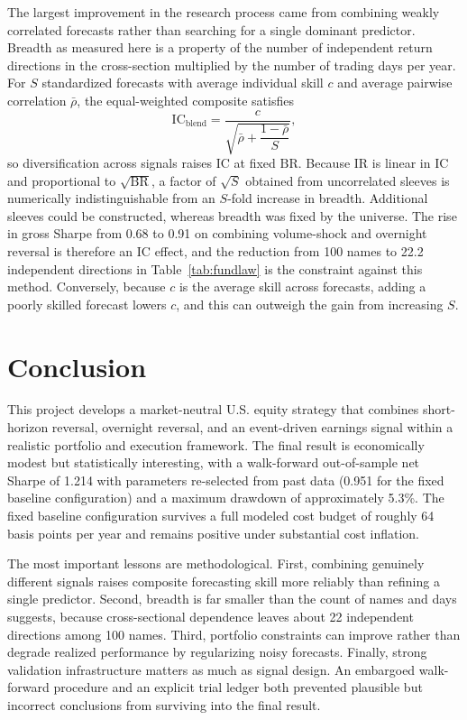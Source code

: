 \documentclass[11pt]{article}
\newcommand{\IR}{\mathrm{IR}}
\newcommand{\IC}{\mathrm{IC}}
\newcommand{\BR}{\mathrm{BR}}
\begin{document}
The largest improvement in the research process came from combining weakly correlated forecasts rather than searching for a single dominant predictor. Breadth as measured here is a property of the number of independent return directions in the cross-section multiplied by the number of trading days per year. For $S$ standardized forecasts with average individual skill $c$ and average pairwise correlation $\bar{\rho}$, the equal-weighted composite satisfies
\begin{equation}
\IC_{\text{blend}} = \frac{c}{\sqrt{\bar{\rho} + \dfrac{1-\bar{\rho}}{S}}},
\label{eq:blendic}
\end{equation}
so diversification across signals raises $\IC$ at fixed $\BR$. Because $\IR$ is linear in $\IC$ and proportional to $\sqrt{\BR}$, a factor of $\sqrt{S}$ obtained from uncorrelated sleeves is numerically indistinguishable from an $S$-fold increase in breadth. Additional sleeves could be constructed, whereas breadth was fixed by the universe. The rise in gross Sharpe from 0.68 to 0.91 on combining volume-shock and overnight reversal is therefore an $\IC$ effect, and the reduction from 100 names to 22.2 independent directions in Table~\ref{tab:fundlaw} is the constraint against this method. Conversely, because $c$ is the average skill across forecasts, adding a poorly skilled forecast lowers $c$, and this can outweigh the gain from increasing $S$.


\section{Conclusion}

This project develops a market-neutral U.S. equity strategy that combines short-horizon reversal, overnight reversal, and an event-driven earnings signal within a realistic portfolio and execution framework. The final result is economically modest but statistically interesting, with a walk-forward out-of-sample net Sharpe of 1.214 with parameters re-selected from past data (0.951 for the fixed baseline configuration) and a maximum drawdown of approximately 5.3\%. The fixed baseline configuration survives a full modeled cost budget of roughly 64 basis points per year and remains positive under substantial cost inflation.

The most important lessons are methodological. First, combining genuinely different signals raises composite forecasting skill more reliably than refining a single predictor. Second, breadth is far smaller than the count of names and days suggests, because cross-sectional dependence leaves about 22 independent directions among 100 names. Third, portfolio constraints can improve rather than degrade realized performance by regularizing noisy forecasts. Finally, strong validation infrastructure matters as much as signal design. An embargoed walk-forward procedure and an explicit trial ledger both prevented plausible but incorrect conclusions from surviving into the final result.
\end{document}
